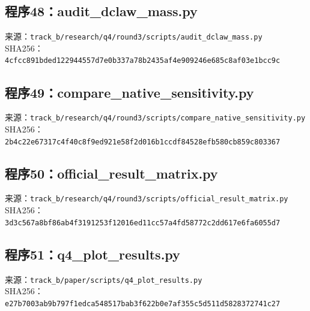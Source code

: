 \subsection*{程序48：audit\_dclaw\_mass.py}
\noindent 来源：\nolinkurl{track_b/research/q4/round3/scripts/audit_dclaw_mass.py}\\
\noindent SHA256：\texttt{4cfcc891bded122944557d7e0b337a78}\allowbreak\texttt{b2435af4e909246e685c8af03e1bcc9c}\\
\clearpage
\subsection*{程序49：compare\_native\_sensitivity.py}
\noindent 来源：\nolinkurl{track_b/research/q4/round3/scripts/compare_native_sensitivity.py}\\
\noindent SHA256：\texttt{2b4c22e67317c4f40c8f9ed921e58f2d}\allowbreak\texttt{016b1ccdf84528efb580cb859c803367}\\
\clearpage
\subsection*{程序50：official\_result\_matrix.py}
\noindent 来源：\nolinkurl{track_b/research/q4/round3/scripts/official_result_matrix.py}\\
\noindent SHA256：\texttt{3d3c567a8bf86ab4f3191253f12016ed}\allowbreak\texttt{11cc57a4fd58772c2dd617e6fa6055d7}\\
\clearpage
\subsection*{程序51：q4\_plot\_results.py}
\noindent 来源：\nolinkurl{track_b/paper/scripts/q4_plot_results.py}\\
\noindent SHA256：\texttt{e27b7003ab9b797f1edca548517bab3f}\allowbreak\texttt{622b0e7af355c5d511d5828372741c27}\\
\clearpage
